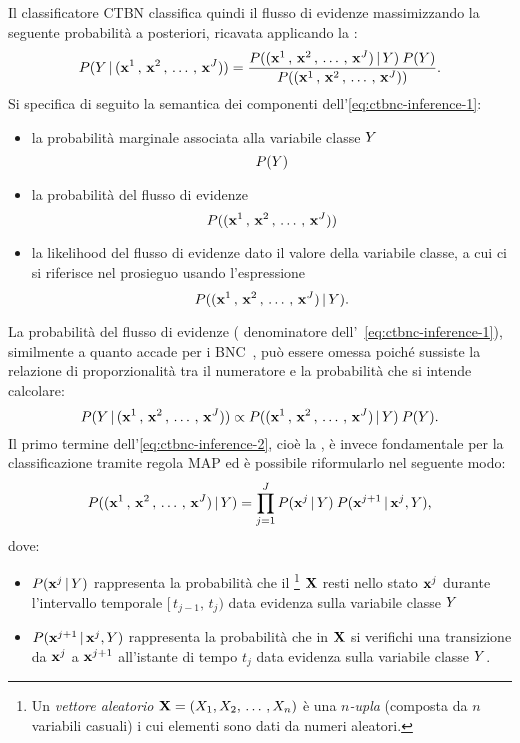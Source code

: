 Il classificatore \acs{CTBN} classifica quindi il flusso di evidenze massimizzando la seguente probabilità a posteriori, ricavata applicando la \emph{}:
\begin{equation}\label{eq:ctbnc-inference-1}
P(\mathnormal{Y}\,\arrowvert\,(\mathbf{x}^1\,,\,\mathbf{x}^2\,,\,\dotsc\,,\,\mathbf{x}^{J}))=\frac{P((\mathbf{x}^1\,,\,\mathbf{x}^2\,,\,\dotsc\,,\,\mathbf{x}^{J})\,\arrowvert\,\mathnormal{Y})\:P(\mathnormal{Y})}{P((\mathbf{x}^1\,,\,\mathbf{x}^2\,,\,\dotsc\,,\,\mathbf{x}^{J}))}\text{.}
\end{equation}
Si specifica di seguito la semantica dei componenti dell'\autoref{eq:ctbnc-inference-1}:
\begin{itemize}
\item la probabilità marginale associata alla variabile classe $\mathnormal{Y}$ \[P(\mathnormal{Y})\]
\item la probabilità del flusso di evidenze \[P((\mathbf{x}^1\,,\,\mathbf{x}^2\,,\,\dotsc\,,\,\mathbf{x}^{J}))\]
\item la likelihood del flusso di evidenze dato il valore della variabile classe, a cui ci si riferisce nel prosieguo usando l'espressione \emph{} \[P((\mathbf{x}^1\,,\,\mathbf{x}^2\,,\,\dotsc\,,\,\mathbf{x}^{J})\,\arrowvert\,\mathnormal{Y})\text{.}\]
\end{itemize}
La probabilità del flusso di evidenze (\ie{} denominatore dell'~\autoref{eq:ctbnc-inference-1}), similmente a quanto accade per i \acs{BNC}~\citep{Friedman1997}, può essere omessa poiché sussiste la relazione di proporzionalità tra il numeratore e la probabilità che si intende calcolare:%
\begin{equation}\label{eq:ctbnc-inference-2}
P(\mathnormal{Y}\,\arrowvert\,(\mathbf{x}^1\,,\,\mathbf{x}^2\,,\,\dotsc\,,\,\mathbf{x}^{J})) \propto P((\mathbf{x}^1\,,\,\mathbf{x}^2\,,\,\dotsc\,,\,\mathbf{x}^{J})\,\arrowvert\,\mathnormal{Y})\:P(\mathnormal{Y})\text{.}
\end{equation}
Il primo termine dell'\autoref{eq:ctbnc-inference-2}, cioè la \emph{}, è invece fondamentale per la classificazione tramite regola \acs{MAP} ed è possibile riformularlo nel seguente modo:
\begin{equation}\label{eq:ctbnc-inference-3}
P((\mathbf{x}^1\,,\,\mathbf{x}^2\,,\,\dotsc\,,\,\mathbf{x}^{J})\,\arrowvert\,\mathnormal{Y})=\prod_{j=1}^{J} P(\mathbf{x}^j\,\arrowvert\,\mathnormal{Y})\:P(\mathbf{x}^{j+1}\,\arrowvert\,\mathbf{x}^j,\mathnormal{Y})\text{,}
\end{equation}
dove:
\begin{itemize}
    \item $P(\mathbf{x}^j\,\arrowvert\,\mathnormal{Y})$ rappresenta la probabilità che il \emph{}\footnote{\label{note:vettore-aleatorio}Un \emph{vettore aleatorio} $\mathbf{X}=(\mathnormal{X}_1,\mathnormal{X}_2,\,\dotsc\,,\mathnormal{X}_n)$ è una $n$\emph{-upla} (composta da $n$ variabili casuali) i cui elementi sono dati da numeri aleatori.} $\mathbf{X}$ resti nello stato $\mathbf{x}^j$ durante l'intervallo temporale $[\,t_{j-1},\,t_j)$ data evidenza sulla variabile classe $\mathnormal{Y}$
    \item $P(\mathbf{x}^{j+1}\,\arrowvert\,\mathbf{x}^j,\mathnormal{Y})$ rappresenta la probabilità che in $\mathbf{X}$ si verifichi una transizione da $\mathbf{x}^j$ a $\mathbf{x}^{j+1}$ all'istante di tempo $t_j$ data evidenza sulla variabile classe $\mathnormal{Y}$.
\end{itemize}
